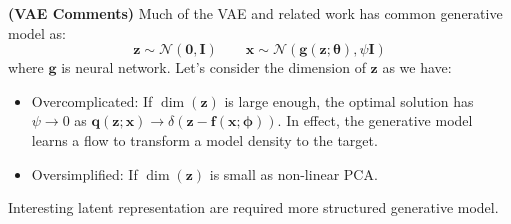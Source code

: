 \begin{remark}{\textbf{(VAE Comments)}}
    Much of the VAE and related work has common generative model as:
    \begin{equation*}
        \boldsymbol z \sim \mathcal{N}(\boldsymbol 0, \boldsymbol I) \qquad \boldsymbol x \sim\mathcal{N}(\boldsymbol g(\boldsymbol z ; \boldsymbol \theta), \psi\boldsymbol I)
    \end{equation*}
    where $\boldsymbol g$ is neural network. Let's consider the dimension of $\boldsymbol z$ as we have:
    \begin{itemize}
        \item Overcomplicated: If $\operatorname{dim}(\boldsymbol z)$ is large enough, the optimal solution has $\psi\rightarrow0$ as $\boldsymbol q(\boldsymbol z;\boldsymbol x) \rightarrow \delta(\boldsymbol z - \boldsymbol f(\boldsymbol x;\boldsymbol \phi))$. In effect, the generative model learns a flow to transform a model density to the target. 
        \item Oversimplified: If $\operatorname{dim}(\boldsymbol z)$ is small as non-linear PCA.
    \end{itemize}
    Interesting latent representation are required more structured generative model. 
\end{remark}

